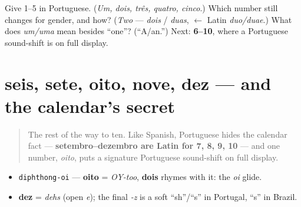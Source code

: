 \begin{tcolorbox}[breakable,colback=teal!4,colframe=teal!35!black,title={Before you move on}]
Give 1–5 in Portuguese. (\emph{Um, dois, três, quatro, cinco}.) Which number still changes for gender, and how? (\emph{Two} — \emph{dois} / \emph{duas}, $\leftarrow$ Latin \emph{duo/duae}.) What does \emph{um/uma} mean besides \textquotedblleft{}one\textquotedblright{}? (\textquotedblleft{}A/an.\textquotedblright{}) Next: \textbf{6–10}, where a Portuguese sound-shift is on full display.
\end{tcolorbox}
\section[seis, sete, oito, nove, dez]{seis, sete, oito, nove, dez — and the calendar's secret}

\label{lesson:PT-C06-numeros-6-10}



\begin{quote}
The rest of the way to ten. Like Spanish, Portuguese hides the calendar fact — \textbf{setembro–dezembro are Latin for 7, 8, 9, 10} — and one number, \emph{oito}, puts a signature Portuguese sound-shift on full display.
\end{quote}

\begin{sounds}
\begin{itemize}
\raggedright
  \item \texttt{diphthong-oi} — \textbf{oito} = \emph{OY-too}, \textbf{dois} rhymes with it: the \emph{oi} glide.
  \item \textbf{dez} = \emph{dehs} (open \emph{e}); the final \emph{-z} is a soft \textquotedblleft{}sh\textquotedblright{}/\textquotedblleft{}s\textquotedblright{} in Portugal, \textquotedblleft{}s\textquotedblright{} in Brazil.
\end{itemize}
\end{sounds}

